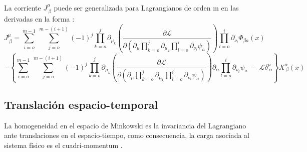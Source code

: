 \documentclass[a4paper,12pt]{article}
\begin{document}
La corriente $J^\mu_{\ \beta}$ puede ser generalizada para Lagrangianos de orden m en las derivadas en la forma \cite{general}:
{\small\begin{equation}
J^\mu_{\ \beta}=\sum\limits_{i=o}^{m-1}\ \sum\limits_{j=o}^{m-(i+1)}(-1)^j\prod\limits_{k=o}^{j}\partial_{\mu_k}\left(\frac{\partial\mathscr{L}}{\partial\left(\partial_\mu\prod\limits_{k=o}^{j}\partial_{\mu_k}\prod\limits_{l=o}^{i}\partial_{\nu_l}\psi_a\right)}\right)\prod\limits_{l=o}^{i}\partial_{\nu_l}\Phi_{\beta a}(x)
\end{equation}
$$-\left\{ \sum\limits_{i=o}^{m-1}\ \sum\limits_{j=o}^{m-(i+1)}(-1)^j\prod\limits_{k=o}^{j}\partial_{\mu_k}\left(\frac{\partial\mathscr{L}}{\partial\left(\partial_\mu\prod\limits_{k=o}^{j}\partial_{\mu_k}\prod\limits_{l=o}^{i}\partial_{\nu_l}\psi_a\right)}\right)\partial_\alpha\prod\limits_{l=o}^{i}\partial_{\nu_l}\psi_a\ -\ \mathscr{L}\delta_{\ \alpha}^\mu \right\}X_{\ \beta}^\alpha(x)$$}
\subsection{Translación espacio-temporal}
La homogeneidad en el espacio de Minkowski es la invariancia del Lagrangiano ante translaciones en el espacio-tiempo, como consecuencia, la carga asociada al sistema físico es el \mbox{cuadri-momentum}  \cite{ noether, greiner}.
\\
\end{document}
